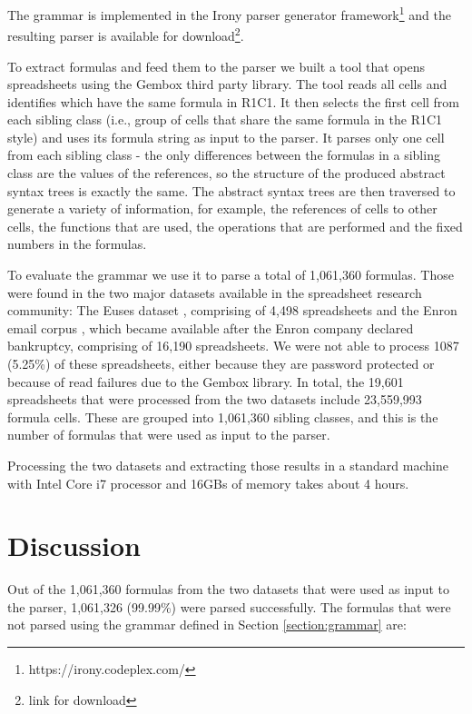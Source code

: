 \documentclass[conference]{IEEEtran}
\begin{document}
The grammar is implemented in the Irony parser generator framework\footnote{https://irony.codeplex.com/} and the resulting parser is available for download\footnote{link for download}.

To extract formulas and feed them to the parser we built a tool that opens spreadsheets using the Gembox third party library. The tool reads all cells and identifies which have the same formula in R1C1. It then selects the first cell from each sibling class (i.e., group of cells that share the same formula in the R1C1 style) and uses its formula string as input to the parser. It parses only one cell from each sibling class - the only differences between the formulas in a sibling class are the values of the references, so the structure of the produced abstract syntax trees is exactly the same. The abstract syntax trees are then traversed to generate a variety of information, for example, the references of cells to other cells, the functions that are used, the operations that are performed and the fixed numbers in the formulas.

To evaluate the grammar we use it to parse a total of 1,061,360 formulas. Those were found in the two major datasets available in the spreadsheet research community: The Euses dataset \cite{euses}, comprising of 4,498 spreadsheets and the Enron email corpus \cite{enron}, which became available after the Enron company declared bankruptcy, comprising of 16,190 spreadsheets. We were not able to process 1087 (5.25\%) of these spreadsheets, either because they are password protected or because of read failures due to the Gembox library. In total, the 19,601 spreadsheets that were processed from the two datasets include 23,559,993 formula cells. These are grouped into 1,061,360 sibling classes, and this is the number of formulas that were used as input to the parser.

Processing the two datasets and extracting those results in a standard machine with Intel Core i7 processor and 16GBs of memory takes about 4 hours.

\section{Discussion}

Out of the 1,061,360 formulas from the two datasets that were used as input to the parser, 1,061,326 (99.99\%) were parsed successfully. The formulas that were not parsed using the grammar defined in Section \ref{section:grammar} are:
\end{document}
